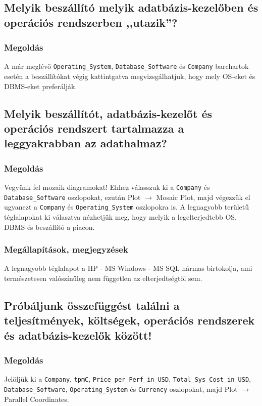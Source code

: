 \documentclass[a4paper,10pt,titlepage]{article}
\begin{document}
\subsection{Melyik beszállító melyik adatbázis-kezelőben és operációs rendszerben ,,utazik''?}
\subsubsection*{Megoldás}
A már meglévő \texttt{Operating\_System}, \texttt{Database\_Software} és \texttt{Company} barchartok esetén a beszállítókat végig kattintgatva megvizsgálhatjuk, hogy mely OS-eket és DBMS-eket preferálják.

\subsection{Melyik beszállítót, adatbázis-kezelőt és operációs rendszert tartalmazza a leggyakrabban az adathalmaz?}
\subsubsection*{Megoldás}
Vegyünk fel mozaik diagramokat! Ehhez válasszuk ki a \texttt{Company} és \texttt{Database\_Software} oszlopokat, ezután Plot $\rightarrow$ Mosaic Plot, majd végezzük el ugyanezt a \texttt{Company} és \texttt{Operating\_System} oszlopokra is. A legnagyobb területű téglalapokat ki választva nézhetjük meg, hogy melyik a legelterjedtebb OS, DBMS és beszállító a piacon.
\subsubsection*{Megállapítások, megjegyzések}
A legnagyobb téglalapot a HP - MS Windows - MS SQL hármas birtokolja, ami természetesen valószínűleg nem független az elterjedtségtől sem.

\subsection{Próbáljunk összefüggést találni a teljesítmények, költségek, operációs rendszerek és adatbázis-kezelők között!}
\subsubsection*{Megoldás}
Jelöljük ki a \texttt{Company}, \texttt{tpmC}, \texttt{Price\_per\_Perf\_in\_USD}, \texttt{Total\_Sys\_Cost\_in\_USD}, \\ \texttt{Database\_Software},  \texttt{Operating\_System} és \texttt{Currency} oszlopokat, majd Plot $\rightarrow$ Parallel Coordinates.
\end{document}

